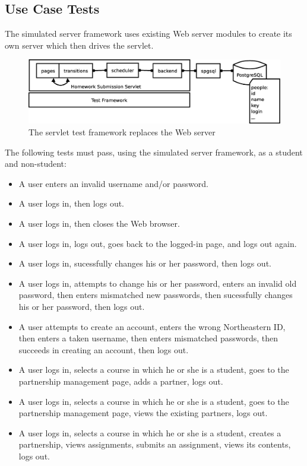 \documentclass[a4paper]{article}
\begin{document}
\subsection{Use Case Tests}\label{subsec:use-case-tests}

The simulated server framework uses existing Web server modules to create its
own server which then drives the servlet.

\begin{figure}[ht]
\centering
\includegraphics[scale=.30]{servlet-test.eps}
\caption{The servlet test framework replaces the Web server}
\label{fig:servlet-tests}
\end{figure}


The following tests must pass, using the simulated server framework, as a
student and non-student:

\begin{itemize}
\item{A user enters an invalid username and/or password.}
\item{A user logs in, then logs out.}
\item{A user logs in, then closes the Web browser.}
\item{A user logs in, logs out, goes back to the logged-in page, and logs out
  again.}
\item{A user logs in, sucessfully changes his or her password, then logs out.}
\item{A user logs in, attempts to change his or her password, enters an invalid
  old password, then enters mismatched new passwords, then sucessfully changes
  his or her password, then logs out.}
\item{A user attempts to create an account, enters the wrong Northeastern ID,
  then enters a taken username, then enters mismatched passwords, then succeeds
  in creating an account, then logs out.}
\item{A user logs in, selects a course in which he or she is a student, goes
  to the partnership management page, adds a partner, logs out.}
\item{A user logs in, selects a course in which he or she is a student, goes
  to the partnership management page, views the existing partners, logs out.}
\item{A user logs in, selects a course in which he or she is a student, creates
  a partnership, views assignments, submits an assignment, views its contents,
  logs out.}
\end{itemize}
\end{document}
